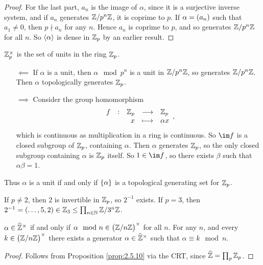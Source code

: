 \begin{proof}
For the last part, $ a_n $ is the image of $ \alpha $, since it is a surjective inverse system, and if $ a_n $ generates $ \mathbb{Z} / p^n\mathbb{Z} $, it is coprime to $ p $. If $ \alpha = \br{a_n} $ such that $ a_1 \ne 0 $, then $ p \nmid a_n $ for any $ n $. Hence $ a_n $ is coprime to $ p $, and so generates $ \mathbb{Z} / p^n\mathbb{Z} $ for all $ n $. So $ \left\langle \alpha \right\rangle $ is dense in $ \mathbb{Z}_p $ by an earlier result.
\end{proof}


\begin{remark}
$ \mathbb{Z}_p^\times $ is the set of units in the ring $ \mathbb{Z}_p $.
\begin{itemize}[leftmargin=0.5in]
\item[$ \impliedby $] If $ \alpha $ is a unit, then $ \alpha \mod p^n $ is a unit in $ \mathbb{Z} / p^n\mathbb{Z} $, so generates $ \mathbb{Z} / p^n\mathbb{Z} $. Then $ \alpha $ topologically generates $ \mathbb{Z}_p $.

\pagebreak

\item[$ \implies $] Consider the group homomorphism
$$ \function[f]{\ZZ_p}{\ZZ_p}{x}{\alpha x}, $$
which is continuous as multiplication in a ring is continuous. So $ \im f $ is a closed subgroup of $ \mathbb{Z}_p $, containing $ \alpha $. Then $ \alpha $ generates $ \mathbb{Z}_p $, so the only closed subgroup containing $ \alpha $ is $ \mathbb{Z}_p $ itself. So $ 1 \in \im f $, so there exists $ \beta $ such that $ \alpha\beta = 1 $.
\end{itemize}
Thus $ \alpha $ is a unit if and only if $ \cbr{\alpha} $ is a topological generating set for $ \mathbb{Z}_p $.
\end{remark}

\begin{example}
If $ p \ne 2 $, then $ 2 $ is invertible in $ \mathbb{Z}_p $, so $ 2^{-1} $ exists. If $ p = 3 $, then $ 2^{-1} = \br{\dots, 5, 2} \in \ZZ_3 \le \prod_{n \in \NN} \ZZ / 3^n\ZZ $.
\end{example}

\begin{proposition}
$ \alpha \in \widehat{\mathbb{Z}}^\times $ if and only if $ \alpha \mod n \in \br{\ZZ / n\ZZ}^\times $ for all $ n $. For any $ n $, and every $ k \in \br{\ZZ / n\ZZ}^\times $ there exists a generator $ \alpha \in \widehat{\mathbb{Z}}^\times $ such that $ \alpha \equiv k \mod n $.
\end{proposition}

\begin{proof}
Follows from Proposition \ref{prop:2.5.10} via the CRT, since $ \widehat{\mathbb{Z}} = \prod_p \mathbb{Z}_p $.
\end{proof}

